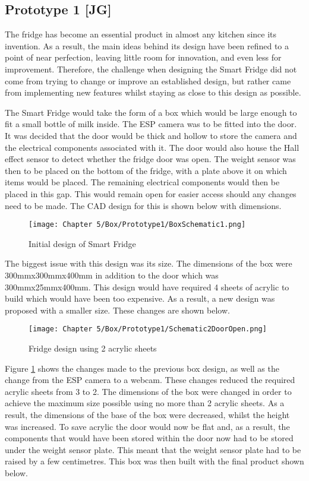 \subsection{Prototype 1 [JG]}

The fridge has become an essential product in almost any kitchen since its invention.
As a result, the main ideas behind its design have been refined to a point of near perfection, leaving little room for innovation, and even less for improvement.
Therefore, the challenge when designing the Smart Fridge did not come from trying to change or improve an established design, but rather came from implementing new features whilst staying as close to this design as possible.

The Smart Fridge would take the form of a box which would be large enough to fit a small bottle of milk inside.
The ESP camera was to be fitted into the door.
It was decided that the door would be thick and hollow to store the camera and the electrical components associated with it.
The door would also house the Hall effect sensor to detect whether the fridge door was open.
The weight sensor was then to be placed on the bottom of the fridge, with a plate above it on which items would be placed.
The remaining electrical components would then be placed in this gap.
This would remain open for easier access should any changes need to be made.
The CAD design for this is shown below with dimensions.

\begin{figure}[H]        
    \centering
    \texttt{[image: Chapter 5/Box/Prototype1/BoxSchematic1.png]}
    \caption{Initial design of Smart Fridge}
\end{figure} 

The biggest issue with this design was its size.
The dimensions of the box were 300mmx300mmx400mm in addition to the door which was 300mmx25mmx400mm.
 This design would have required 4 sheets of acrylic to build which would have been too expensive.
As a result, a new design was proposed with a smaller size.
These changes are shown below.

\begin{figure}[H]        
    \centering
    \texttt{[image: Chapter 5/Box/Prototype1/Schematic2DoorOpen.png]}
    \caption{Fridge design using 2 acrylic sheets}
    \label{fig:firstox}
\end{figure} 

Figure \ref{fig:firstox} shows the changes made to the previous box design, as well as the change from the ESP camera to a webcam.
These changes reduced the required acrylic sheets from 3 to 2.
The dimensions of the box were changed in order to achieve the maximum size possible using no more than 2 acrylic sheets.
As a result, the dimensions of the base of the box were decreased, whilst the height was increased.
To save acrylic the door would now be flat and, as a result, the components that would have been stored within the door now had to be stored under the weight sensor plate.
This meant that the weight sensor plate had to be raised by a few centimetres.
This box was then built with the final product shown below.

